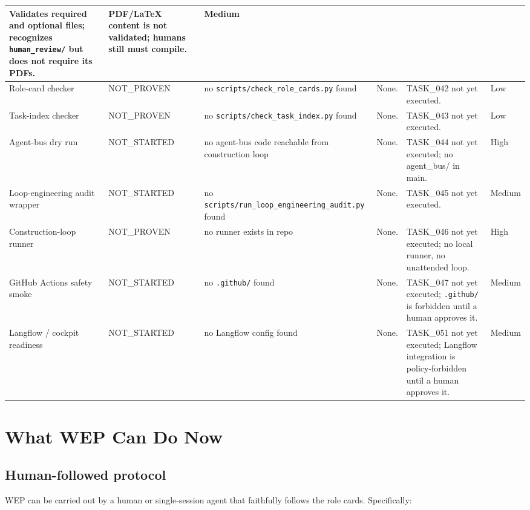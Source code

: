 \documentclass[11pt,a4paper]{article}
\begin{document}
\begin{longtable}{p{3.2cm} p{2.1cm} p{3.4cm} p{3.4cm} p{3.4cm} p{2.4cm}}
  Validates required and optional files; recognizes
  \texttt{human\_review/} but does not require its PDFs. &
  PDF/LaTeX content is not validated; humans still must
  compile. &
  Medium \\ \hline
Role-card checker &
  NOT\_PROVEN &
  no \texttt{scripts/check\_role\_cards.py} found &
  None. &
  TASK\_042 not yet executed. &
  Low \\ \hline
Task-index checker &
  NOT\_PROVEN &
  no \texttt{scripts/check\_task\_index.py} found &
  None. &
  TASK\_043 not yet executed. &
  Low \\ \hline
Agent-bus dry run &
  NOT\_STARTED &
  no agent-bus code reachable from construction loop &
  None. &
  TASK\_044 not yet executed; no agent\_bus/ in main. &
  High \\ \hline
Loop-engineering audit wrapper &
  NOT\_STARTED &
  no \texttt{scripts/run\_loop\_engineering\_audit.py} found &
  None. &
  TASK\_045 not yet executed. &
  Medium \\ \hline
Construction-loop runner &
  NOT\_PROVEN &
  no runner exists in repo &
  None. &
  TASK\_046 not yet executed; no local runner,
  no unattended loop. &
  High \\ \hline
GitHub Actions safety smoke &
  NOT\_STARTED &
  no \texttt{.github/} found &
  None. &
  TASK\_047 not yet executed; \texttt{.github/} is
  forbidden until a human approves it. &
  Medium \\ \hline
Langflow / cockpit readiness &
  NOT\_STARTED &
  no Langflow config found &
  None. &
  TASK\_051 not yet executed; Langflow integration is
  policy-forbidden until a human approves it. &
  Medium \\ \bottomrule
\end{longtable}
\normalsize

\section{What WEP Can Do Now}

\subsection{Human-followed protocol}

WEP can be carried out by a human or single-session agent that
faithfully follows the role cards. Specifically:
\end{document}
